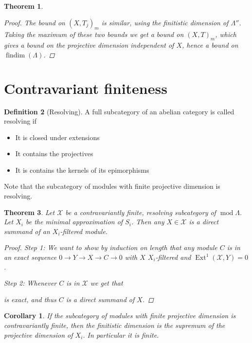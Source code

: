 \documentclass[11pt, a4paper, english]{article}
\newtheorem{theorem}{Theorem}[section]
\newtheorem{cor}{Corollary}[theorem]
\theoremstyle{definition}
\newtheorem{defn}[theorem]{Definition}
\DeclareMathOperator{\Hom}{Hom}
\DeclareMathOperator{\Ext}{Ext}
\DeclareMathOperator{\findim}{findim}
\def\mod{\operatorname{mod}}
\begin{document}
\begin{theorem}
\begin{proof}
		The bound on $(X, T_j)_m$ is similar, using the finitistic dimension of $\Lambda''$. Taking the maximum of these two bounds we get a bound on $(X, T)_m$, which gives a bound on the projective dimension independent of $X$, hence a bound on $\findim(\Lambda)$. 
	\end{proof}
\end{theorem}

\section{Contravariant finiteness}

\begin{defn}[Resolving]
	A full subcategory of an abelian category is called resolving if 
	\begin{itemize}
		\item It is closed under extensions
		\item It contains the projectives
		\item It is contains the kernels of its epimorphisms
	\end{itemize}
\end{defn}

Note that the subcategory of modules with finite projective dimension is resolving.

\begin{theorem} \cite[3.8]{AR91}
	Let $\mathcal X$ be a contravariantly finite, resolving subcategory of $\mod \Lambda$. Let $X_i$ be the minimal approximation of $S_i$. Then any $X \in \mathcal X$ is a direct summand of an $X_i$-filtered module.
	\begin{proof}
		Step 1: We want to show by induction on length that any module $C$ is in an exact sequence $0 \to Y \to X \to C \to 0$ with $X$ $X_i$-filtered and $\Ext^1(\mathcal X, Y)=0$.
		
		Step 2: Whenever $C$ is in $\mathcal X$ we get that
		
		is exact, and thus $C$ is a direct summand of $X$.
	\end{proof}
\end{theorem}

\begin{cor}
	If the subcategory of modules with finite projective dimension is contravariantly finite, then the finitistic dimension is the supremum of the projective dimension of $X_i$. In particular it is finite.
\end{cor}
\end{document}
